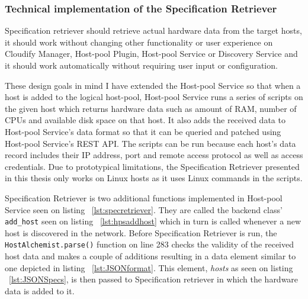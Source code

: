 \subsubsection{Technical implementation of the Specification Retriever}

Specification retriever should retrieve actual hardware data from the target hosts, it should work without changing other functionality or user experience on Cloudify Manager, Host-pool Plugin, Host-pool Service or Discovery Service and it should work automatically without requiring user input or configuration.

These design goals in mind I have extended the Host-pool Service so that when a host is added to the logical host-pool, Host-pool Service runs a series of scripts on the given host which returns hardware data such as amount of RAM, number of CPUs and available disk space on that host.
It also adds the received data to Host-pool Service's data format so that it can be queried and patched using Host-pool Service's REST API. The scripts can be run because each host's data record includes their IP address, port and remote access protocol as well as access credentials. Due to prototypical limitations, the Specification Retriever presented in this thesis only works on Linux hosts as it uses Linux commands in the scripts.

\pagebreak



Specification Retriever is two additional functions implemented in Host-pool Service seen on listing ~\ref{lst:specretriever}. They are called the backend class' \verb|add_host| seen on listing ~\ref{lst:hpsaddhost} which in turn is called whenever a new host is discovered in the network. Before Specification Retriever is run, the \verb|HostAlchemist.parse()| function on line 283 checks the validity of the received host data and makes a couple of additions resulting in a data element similar to one depicted in listing ~\ref{lst:JSONformat}. This element, \textit{hosts} as seen on listing ~\ref{lst:JSONSpecs}, is then passed to Specification retriever in which the hardware data is added to it.



